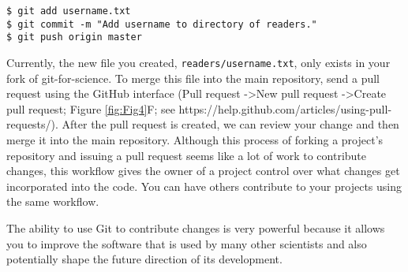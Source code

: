 \begin{verbatim}
$ git add username.txt
$ git commit -m "Add username to directory of readers."
$ git push origin master
\end{verbatim}

Currently, the new file you created, \verb|readers/username.txt|, only exists in your fork of git-for-science.
To merge this file into the main repository, send a pull request using the GitHub interface (Pull request -\textgreater New pull request -\textgreater Create pull request; Figure \ref{fig:Fig4}F; see https://help.github.com/articles/using-pull-requests/).
After the pull request is created, we can review your change and then merge it into the main repository.
Although this process of forking a project’s repository and issuing a pull request seems like a lot of work to contribute changes, this workflow gives the owner of a project control over what changes get incorporated into the code.
You can have others contribute to your projects using the same workflow.

The ability to use Git to contribute changes is very powerful because it allows you to improve the software that is used by many other scientists and also potentially shape the future direction of its development.
